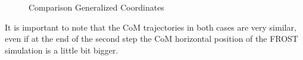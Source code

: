 \documentclass[11pt]{article}
\begin{document}
\begin{figure}[H]
\centering
{} \quad
{}
\caption{Comparison Generalized Coordinates}
\end{figure}

It is important to note that the CoM trajectories in both cases are very similar, even if at the end of the second step the CoM horizontal position of the FROST simulation is a little bit bigger. 
\end{document}
